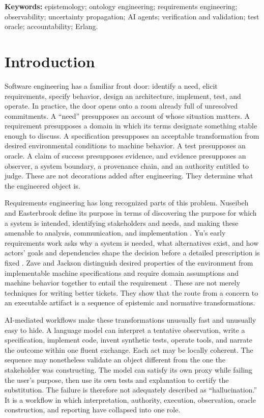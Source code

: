 \documentclass[10pt,a4paper]{article}
\begin{document}
\noindent\textbf{Keywords:} epistemology; ontology engineering; requirements engineering; observability; uncertainty propagation; AI agents; verification and validation; test oracle; accountability; Erlang.

\section{Introduction}

Software engineering has a familiar front door: identify a need, elicit requirements, specify behavior, design an architecture, implement, test, and operate. In practice, the door opens onto a room already full of unresolved commitments. A ``need'' presupposes an account of whose situation matters. A requirement presupposes a domain in which its terms designate something stable enough to discuss. A specification presupposes an acceptable transformation from desired environmental conditions to machine behavior. A test presupposes an oracle. A claim of success presupposes evidence, and evidence presupposes an observer, a system boundary, a provenance chain, and an authority entitled to judge. These are not decorations added after engineering. They determine what the engineered object is.

Requirements engineering has long recognized parts of this problem. Nuseibeh and Easterbrook define its purpose in terms of discovering the purpose for which a system is intended, identifying stakeholders and needs, and making these amenable to analysis, communication, and implementation \cite{nuseibeh2000}. Yu's early requirements work asks why a system is needed, what alternatives exist, and how actors' goals and dependencies shape the decision before a detailed prescription is fixed \cite{yu1997}. Zave and Jackson distinguish desired properties of the environment from implementable machine specifications and require domain assumptions and machine behavior together to entail the requirement \cite{zavejackson1997}. These are not merely techniques for writing better tickets. They show that the route from a concern to an executable artifact is a sequence of epistemic and normative transformations.

AI-mediated workflows make these transformations unusually fast and unusually easy to hide. A language model can interpret a tentative observation, write a specification, implement code, invent synthetic tests, operate tools, and narrate the outcome within one fluent exchange. Each act may be locally coherent. The sequence may nonetheless validate an object different from the one the stakeholder was constructing. The model can satisfy its own proxy while failing the user's purpose, then use its own tests and explanation to certify the substitution. The failure is therefore not adequately described as ``hallucination.'' It is a workflow in which interpretation, authority, execution, observation, oracle construction, and reporting have collapsed into one role.
\end{document}
